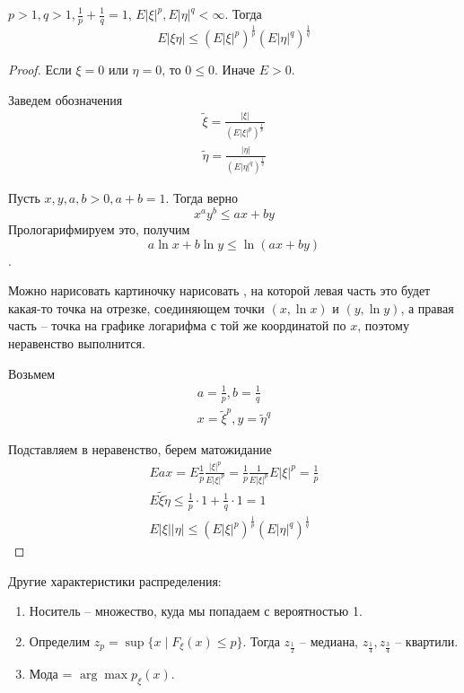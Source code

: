 \begin{theorem}
    
$p > 1, q > 1, \frac1p + \frac1q = 1$, $E |\xi|^p, E|\eta|^q < \infty$. Тогда
$$E|\xi\eta| \leq (E |\xi|^p)^\frac1p (E |\eta|^q)^\frac1q$$
\end{theorem}
\begin{proof}
Если $\xi = 0$ или $\eta = 0$, то $0 \leq 0$. Иначе $E > 0$.

Заведем обозначения 
\begin{gather*}
\widetilde{\xi} = \frac{|\xi|}{(E |\xi|^p)^\frac1p}\\
\widetilde{\eta} = \frac{|\eta|}{(E |\eta|^q)^\frac1q}
\end{gather*}

Пусть $x, y, a, b > 0, a + b = 1$. Тогда верно $$x^ay^b \leq ax + by$$
Прологарифмируем это, получим $$a \ln x + b \ln y \leq \ln (ax + by)$$.

Можно нарисовать картиночку \TODO нарисовать \TODO, на которой левая часть это будет какая-то точка на отрезке, соединяющем точки $(x, \ln x)$ и $(y, \ln y)$, а правая часть -- точка на графике логарифма с той же координатой по $x$, поэтому неравенство выполнится.

Возьмем
\begin{gather*}
a = \frac1p, b = \frac1q\\
x = \widetilde{\xi}^p, y = \widetilde{\eta}^q
\end{gather*}

Подставляем в неравенство, берем матожидание
\begin{gather*}
E ax = E \frac1p \frac{|\xi|^p}{E|\xi|^p} = \frac1p \frac{1}{E|\xi|^p} E |\xi|^p = \frac 1p\\
E \widetilde{\xi} \widetilde{\eta} \leq \frac1p \cdot 1 + \frac1q \cdot 1 = 1\\
E |\xi||\eta| \leq (E |\xi|^p)^\frac1p (E |\eta|^q)^\frac1q
\end{gather*}

\end{proof}

Другие характеристики распределения:
\begin{enumerate}
\item Носитель -- множество, куда мы попадаем с вероятностью 1.
\item Определим $z_p = \sup \{x \mid F_\xi (x) \leq p\}$. Тогда $z_\frac12$ -- медиана, $z_\frac14, z_\frac34$ -- квартили.
\item Мода = $\arg\max p_\xi(x)$.
\end{enumerate}


